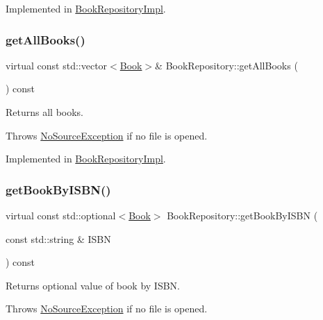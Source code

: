 Implemented in \hyperlink{classBookRepositoryImpl_aec9b4797e9153c1088c7e4a6659124be}{Book\+Repository\+Impl}.

\mbox{\label{classBookRepository_a4cc8b9c8427d4ef32cd671b87a0d17b0}} 
\subsubsection{\texorpdfstring{get\+All\+Books()}{getAllBooks()}}
{\footnotesize\ttfamily virtual const std\+::vector$<$\hyperlink{classBook}{Book}$>$\& Book\+Repository\+::get\+All\+Books (\begin{DoxyParamCaption}{ }\end{DoxyParamCaption}) const\hspace{0.3cm}{\ttfamily [pure virtual]}}

Returns all books.

Throws \hyperlink{structNoSourceException}{No\+Source\+Exception} if no file is opened. 

Implemented in \hyperlink{classBookRepositoryImpl_aa3603924efed4ec623235193d2350569}{Book\+Repository\+Impl}.

\mbox{\label{classBookRepository_a0334aacb95e6bd4ff7477b9b9ba1e72f}} 
\subsubsection{\texorpdfstring{get\+Book\+By\+I\+S\+B\+N()}{getBookByISBN()}}
{\footnotesize\ttfamily virtual const std\+::optional$<$\hyperlink{classBook}{Book}$>$ Book\+Repository\+::get\+Book\+By\+I\+S\+BN (\begin{DoxyParamCaption}\item[{const std\+::string \&}]{I\+S\+BN }\end{DoxyParamCaption}) const\hspace{0.3cm}{\ttfamily [pure virtual]}}

Returns optional value of book by I\+S\+BN.

Throws \hyperlink{structNoSourceException}{No\+Source\+Exception} if no file is opened. 

